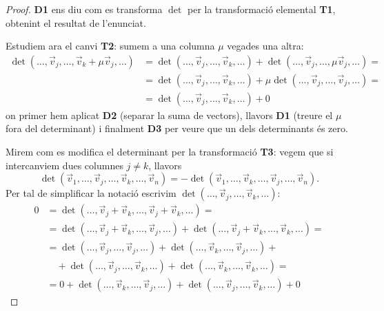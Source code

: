 \begin{proof}
  \textbf{D1} ens diu com es transforma $\det$ per la transformació elemental \textbf{T1}, obtenint el resultat de l'enunciat.
  
      Estudiem ara el canvi \textbf{T2}: sumem a una columna $\mu$ vegades una altra: 
    \begin{align*}
    \det(\dots, \vec v_j, \dots, \vec v_k+\mu\vec v_j,\dots) & =\det(\dots, \vec v_j, \dots, \vec v_k,\dots) + \det(\dots, \vec v_j, \dots,\mu\vec v_j,\dots)= \\ &
    = \det(\dots, \vec v_j, \dots, \vec v_k,\dots) + \mu\det(\dots, \vec v_j, \dots,\vec v_j,\dots)= \\ &
    = \det(\dots, \vec v_j, \dots, \vec v_k,\dots) + 0
    \end{align*}
    on primer hem aplicat \textbf{D2} (separar la suma de vectors), llavors \textbf{D1} (treure el $\mu$ fora del determinant) i finalment \textbf{D3} per veure que un dels determinants és zero.
  
  Mirem com es modifica el determinant per la transformació \textbf{T3}: vegem que si intercanviem dues columnes $j\neq k$, llavors
    $$
    \det(\vec v_1,\dots , \vec v_j, \dots, \vec v_k, \dots ,\vec v_n)=-\det(\vec v_1,\dots , \vec v_k, \dots, \vec v_j, \dots ,\vec v_n) .
    $$
    Per tal de simplificar la notació escrivim $\det(\dots , \vec v_j, \dots, \vec v_k, \dots)$:
    \begin{align*}
        0  & =  \det(\dots , \vec v_j+\vec v_k, \dots, \vec v_j+\vec v_k, \dots)  = \\
          & =  \det(\dots , \vec v_j+\vec v_k, \dots, \vec v_j, \dots) + \det(\dots , \vec v_j+\vec v_k, \dots, \vec v_k, \dots) = \\
          & =  \det(\dots , \vec v_j, \dots, \vec v_j, \dots) + \det(\dots , \vec v_k, \dots, \vec v_j, \dots) + \\
           &  \quad + \det(\dots , \vec v_j, \dots, \vec v_k, \dots) + \det(\dots , \vec v_k, \dots, \vec v_k, \dots) = \\
           & =  0 + \det(\dots , \vec v_k, \dots, \vec v_j , \dots) + \det(\dots , \vec v_j, \dots, \vec v_k , \dots) + 0
    \end{align*}
\end{proof}

